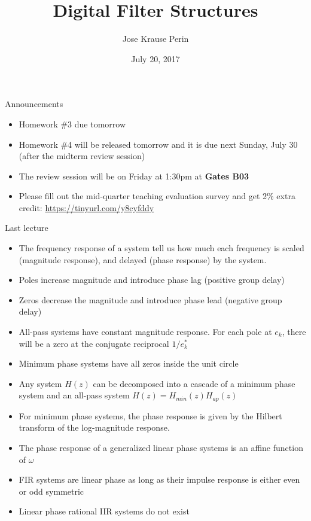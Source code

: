 \documentclass[10pt, handout]{beamer}
\title[EE 264]{Digital Filter Structures}
\author{Jose Krause Perin}
\institute{Stanford University}
\date{July 20, 2017}
\begin{document}
\begin{frame}
  \titlepage
\end{frame}

%
\begin{frame}{Announcements}
	\begin{itemize}
		\item Homework \#3 due tomorrow
		\item Homework \#4 will be released tomorrow and it is due next Sunday, July 30 (after the midterm review session)
		\item The review session will be on Friday at 1:30pm at \textbf{Gates B03}
		\item Please fill out the mid-quarter teaching evaluation survey and get 2\% extra credit: \url{https://tinyurl.com/y8cyfddy}
	\end{itemize}
\end{frame}

%
\begin{frame}{Last lecture}
	\begin{itemize}
		\item The frequency response of a system tell us how much each frequency is scaled (magnitude response), and delayed (phase response) by the system.
		\item Poles increase magnitude and introduce phase lag (positive group delay)
		\item Zeros decrease the magnitude and introduce phase lead (negative group delay)
		\item All-pass systems have constant magnitude response. For each pole at $e_k$, there will be a zero at the conjugate reciprocal $1/e^*_k$
		\item Minimum phase systems have all zeros inside the unit circle
		\item Any system $H(z)$ can be decomposed into a cascade of a minimum phase system and an all-pass system $H(z) = H_{min}(z)H_{ap}(z)$
		\item For minimum phase systems, the phase response is given by the Hilbert transform of the log-magnitude response. 
		\item The phase response of a generalized linear phase systems is an affine function of $\omega$
		\item FIR systems are linear phase as long as their impulse response is either even or odd symmetric
		\item Linear phase rational IIR systems do not exist
	\end{itemize}
\end{frame}
\end{document}
